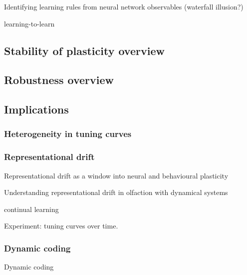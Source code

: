 \documentclass{article}
\theoremstyle{definition} \newtheorem{definition}{Definition}
\theoremstyle{remark} \newtheorem{remark}{Remark}
\newcounter{ct}
\begin{document}
\citep{shervani2023meta}
\citep{bell2024discovering}
\citep{jordan2021plasticity}

Identifying learning rules from neural network observables \citep{nayebi2020learning} (waterfall illusion?)
\citep{kepple2022curriculum}
\citep{mcmahan2021learning}
\citep{ashwood2020inferring}

\citep{tyulmankov2022meta}

\citep{kusmierz2017learning}

learning-to-learn \citep{bellec2018long}

\subsection{Stability of plasticity overview}
\citep{kuan1994convergence}

\subsection{Robustness overview}
\citep{revay2023recurrent, revay2020contracting}

\subsection{Implications}

\subsubsection{Heterogeneity in tuning curves}




\subsubsection{Representational drift}
\citep{wolff2020drifting}

\citep{masset2022drifting}

\citep{buschman2022wm}

Representational drift as a window into neural and behavioural plasticity \citep{micou2023representational}

Understanding representational drift in olfaction with dynamical  systems \citep{barwich2023drift}

continual learning \citep{driscoll2022representational}

Experiment: tuning curves over time.




\subsubsection{Dynamic coding}
Dynamic coding \citep{stroud2024computational}
\end{document}
